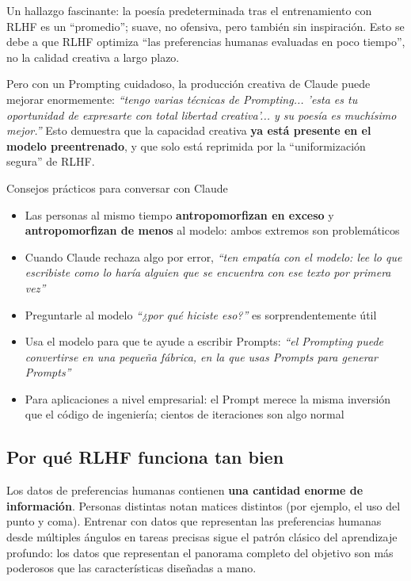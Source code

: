 \documentclass[a4paper]{article}
\begin{document}
Un hallazgo fascinante: la poesía predeterminada tras el entrenamiento con RLHF es un ``promedio''; suave, no ofensiva, pero también sin inspiración. Esto se debe a que RLHF optimiza ``las preferencias humanas evaluadas en poco tiempo'', no la calidad creativa a largo plazo.

Pero con un Prompting cuidadoso, la producción creativa de Claude puede mejorar enormemente: \textit{``tengo varias técnicas de Prompting... 'esta es tu oportunidad de expresarte con total libertad creativa'... y su poesía es muchísimo mejor.''} Esto demuestra que la capacidad creativa \textbf{ya está presente en el modelo preentrenado}, y que solo está reprimida por la ``uniformización segura'' de RLHF.

\begin{knowledgebox}{Consejos prácticos para conversar con Claude}
\begin{itemize}
    \item Las personas al mismo tiempo \textbf{antropomorfizan en exceso} y \textbf{antropomorfizan de menos} al modelo: ambos extremos son problemáticos
    \item Cuando Claude rechaza algo por error, \textit{``ten empatía con el modelo: lee lo que escribiste como lo haría alguien que se encuentra con ese texto por primera vez''}
    \item Preguntarle al modelo \textit{``¿por qué hiciste eso?''} es sorprendentemente útil
    \item Usa el modelo para que te ayude a escribir Prompts: \textit{``el Prompting puede convertirse en una pequeña fábrica, en la que usas Prompts para generar Prompts''}
    \item Para aplicaciones a nivel empresarial: el Prompt merece la misma inversión que el código de ingeniería; cientos de iteraciones son algo normal
\end{itemize}
\end{knowledgebox}

\subsection{Por qué RLHF funciona tan bien}

Los datos de preferencias humanas contienen \textbf{una cantidad enorme de información}. Personas distintas notan matices distintos (por ejemplo, el uso del punto y coma). Entrenar con datos que representan las preferencias humanas desde múltiples ángulos en tareas precisas sigue el patrón clásico del aprendizaje profundo: los datos que representan el panorama completo del objetivo son más poderosos que las características diseñadas a mano.
\end{document}
